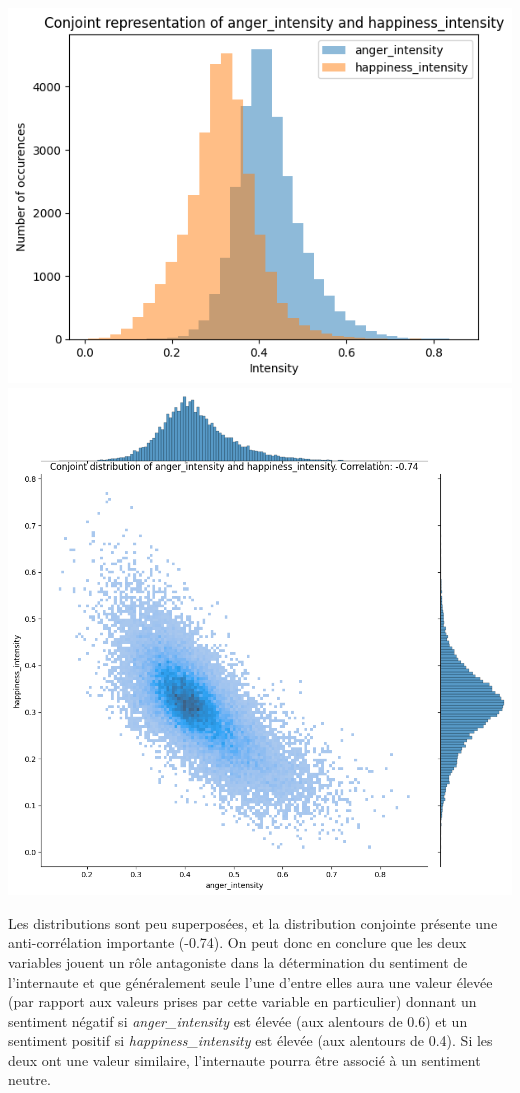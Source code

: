 \documentclass{article}
\begin{document}
\begin{center}
    \includegraphics[scale=0.39]{./img/conjoint_representation_anger_intensity_happiness_intensity.png}
    \includegraphics[scale=0.23]{./img/conjoint_distribution_anger_intensity_happiness_intensity.png}
\end{center}

Les distributions sont peu superposées, et la distribution conjointe présente une
anti-corrélation importante (-0.74). On peut donc en conclure que les deux variables jouent
un rôle antagoniste dans la détermination du sentiment de l'internaute et que
généralement seule l'une d'entre elles aura une valeur élevée (par rapport aux valeurs prises
par cette variable en particulier) donnant un sentiment
négatif si \textit{anger\_intensity} est élevée (aux alentours de 0.6) 
et un sentiment positif si
\textit{happiness\_intensity} est élevée (aux alentours de 0.4). Si les deux ont une
valeur similaire, l'internaute pourra être associé à un sentiment neutre.
\end{document}
